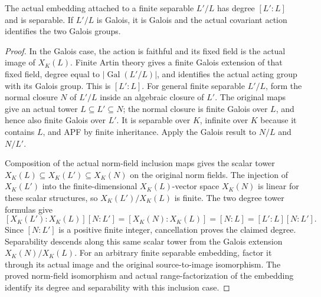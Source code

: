 \begin{lemma}
\label{fw:finite-norm-field-degree-separable}
\leanok
The actual embedding attached to a finite separable $L'/L$ has degree
$[L':L]$ and is separable. If $L'/L$ is Galois, it is Galois and the
actual covariant action identifies the two Galois groups.
\end{lemma}
\begin{proof}
In the Galois case, the action is faithful and its fixed field is the
actual image of $X_K(L)$. Finite Artin theory gives a finite Galois
extension of that fixed field, degree equal to $|\operatorname{Gal}(L'/L)|$,
and identifies the actual acting group with its Galois group.
This is $[L':L]$.
For general finite separable $L'/L$, form the normal closure $N$ of
$L'/L$ inside an algebraic closure of $L'$. The original maps give
an actual tower $L\subseteq L'\subseteq N$; the normal closure is
finite Galois over $L$, and hence also finite Galois over $L'$.
It is separable over $K$, infinite over $K$ because it contains $L$,
and APF by finite inheritance. Apply the Galois result to $N/L$ and
$N/L'$.

Composition of the actual norm-field inclusion maps gives the scalar
tower $X_K(L)\subseteq X_K(L')\subseteq X_K(N)$ on the original
norm fields. The injection of $X_K(L')$ into the finite-dimensional
$X_K(L)$-vector space $X_K(N)$ is linear for these scalar structures,
so $X_K(L')/X_K(L)$ is finite. The two degree tower formulas give
\[
 [X_K(L'):X_K(L)] [N:L']
 = [X_K(N):X_K(L)]
 = [N:L]
 = [L':L][N:L'].
\]
Since $[N:L']$ is a positive finite integer, cancellation proves the
claimed degree. Separability descends along this same scalar tower
from the Galois extension $X_K(N)/X_K(L)$.
For an arbitrary finite separable embedding, factor it through its
actual image and the original source-to-image isomorphism. The
proved norm-field isomorphism and actual range-factorization of the
embedding identify its degree and separability with this inclusion
case.
\end{proof}

